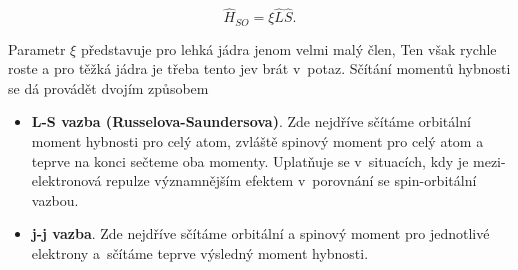 \begin{equation}
\hat{H}_{SO} = \xi \hat{L} \hat{S}.
\label{rov:VE-67}
\end{equation}

\noindent Parametr $\xi$ představuje pro lehká jádra jenom velmi malý člen, Ten však rychle roste a pro těžká jádra je třeba tento jev brát v~potaz. Sčítání momentů hybnosti se dá provádět dvojím způsobem

\begin{itemize}
\item \textbf{L-S vazba (Russelova-Saundersova)}. Zde nejdříve sčítáme orbitální moment hybnosti pro celý atom, zvláště spinový moment pro celý atom a teprve na konci sečteme oba momenty. Uplatňuje se v~situacích, kdy je mezi-elektronová repulze významnějším efektem v~porovnání se spin-orbitální vazbou.  

\item \textbf{j-j vazba}. Zde nejdříve sčítáme orbitální a spinový moment pro jednotlivé elektrony a~sčítáme teprve výsledný moment hybnosti. 

\end{itemize}     



   
    


   

 



 




 
